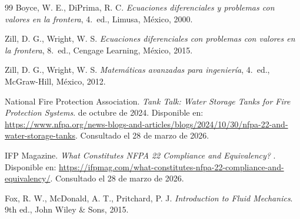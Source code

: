 \documentclass[oneside,letter,spanish,activeacute,english,links,10pt]{amcaGCS_EDO}
\begin{document}
\begin{thebibliography}{99}
	 Boyce, W. E., DiPrima, R. C. \emph{Ecuaciones diferenciales y problemas con valores en la frontera}, 4.\textordfeminine\ ed., Limusa, México, 2000.
	
	 Zill, D. G., Wright, W. S. \emph{Ecuaciones diferenciales con problemas con valores en la frontera}, 8.\textordfeminine\ ed., Cengage Learning, México, 2015.
	
	 Zill, D. G., Wright, W. S. \emph{Matemáticas avanzadas para ingeniería}, 4.\textordfeminine\ ed., McGraw-Hill, México, 2012.
	
	National Fire Protection Association.
	\newblock \textit{Tank Talk: Water Storage Tanks for Fire Protection Systems}.
	 de octubre de 2024.
	\newblock Disponible en:
	\url{https://www.nfpa.org/news-blogs-and-articles/blogs/2024/10/30/nfpa-22-and-water-storage-tanks}.
	\newblock Consultado el 28 de marzo de 2026.
	
	IFP Magazine.
	\newblock \textit{What Constitutes NFPA 22 Compliance and Equivalency?}
	.
	\newblock Disponible en:
	\url{https://ifpmag.com/what-constitutes-nfpa-22-compliance-and-equivalency/}.
	\newblock Consultado el 28 de marzo de 2026.
	
	Fox, R. W., McDonald, A. T., Pritchard, P. J.
	\newblock \textit{Introduction to Fluid Mechanics}.
	\newblock 9th ed., John Wiley \& Sons, 2015.
\end{thebibliography}
\end{document}

